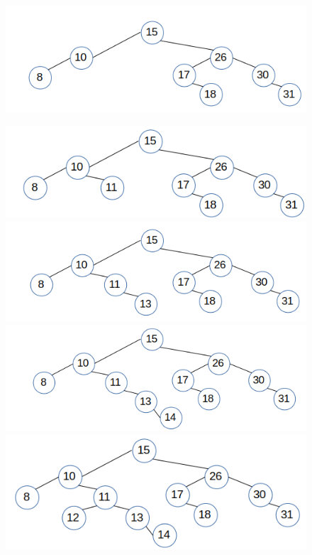 \documentclass{article}
\begin{document}
\begin{enumerate}
\begin{figure}[H]
	\includegraphics[]{P10/7-8}
\end{figure}

\begin{figure}[H]
	\includegraphics[]{P10/8-11}
	\includegraphics[]{P10/9-13}
	\includegraphics[]{P10/10-14}
	\includegraphics[]{P10/11-12}
\end{figure}


\end{enumerate}
\end{document}
